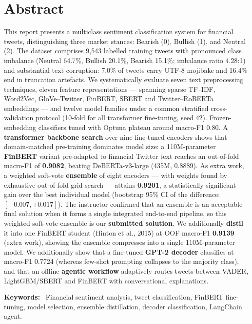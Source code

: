 \documentclass[11pt,a4paper]{article}
\newcommand{\tH}[1]{\textcolor{maincolor}{\textbf{#1}}}
\newcommand{\distf}{0.9139}    %
\begin{document}
\section*{Abstract}
This report presents a multiclass sentiment classification system for financial tweets,
distinguishing three market stances: Bearish (0), Bullish (1), and Neutral (2). The dataset
comprises 9{,}543 labelled training tweets with pronounced class imbalance (Neutral 64.7\%,
Bullish 20.1\%, Bearish 15.1\%; imbalance ratio 4.28:1) and substantial text corruption: 7.0\% of
tweets carry UTF-8 mojibake and 16.4\% end in truncation artefacts. We systematically evaluate
seven text preprocessing techniques, eleven feature representations --- spanning sparse TF--IDF,
Word2Vec, GloVe--Twitter, FinBERT, SBERT and Twitter--RoBERTa embeddings --- and twelve model
families under a common stratified cross-validation protocol (10-fold for all transformer
fine-tuning, seed 42). Frozen-embedding classifiers tuned with Optuna plateau around macro-F1 0.80.
A \textbf{transformer backbone search} over nine fine-tuned encoders shows that domain-matched
pre-training dominates model size: a 110M-parameter \textbf{FinBERT} variant pre-adapted to
financial Twitter text reaches an out-of-fold macro-F1 of \textbf{0.9082}, beating DeBERTa-v3-large
(435M, 0.8889). As extra work, a weighted soft-vote \textbf{ensemble} of eight encoders --- with
weights found by exhaustive out-of-fold grid search --- attains \textbf{0.9201}, a statistically
significant gain over the best individual model (bootstrap 95\% CI of the difference:
$[+0.007, +0.017]$). The instructor confirmed that an ensemble is an acceptable final solution
when it forms a single integrated end-to-end pipeline, so this weighted soft-vote ensemble is our
\textbf{submitted solution}. We additionally \textbf{distil} it into one FinBERT student (Hinton
et al., 2015) at OOF macro-F1 \textbf{\distf} (extra work), showing the ensemble compresses into a
single 110M-parameter model. We additionally show that a fine-tuned \textbf{GPT-2
decoder} classifies at macro-F1 0.7724 (whereas few-shot prompting collapses to the majority
class), and that an offline \textbf{agentic workflow} adaptively routes tweets between VADER,
LightGBM/SBERT and FinBERT with conversational explanations.

\vspace{2pt}
{\footnotesize\tH{Keywords:}~ Financial sentiment analysis, tweet classification, FinBERT
fine-tuning, model selection, ensemble distillation, decoder classification, LangChain agent.}
\end{document}
